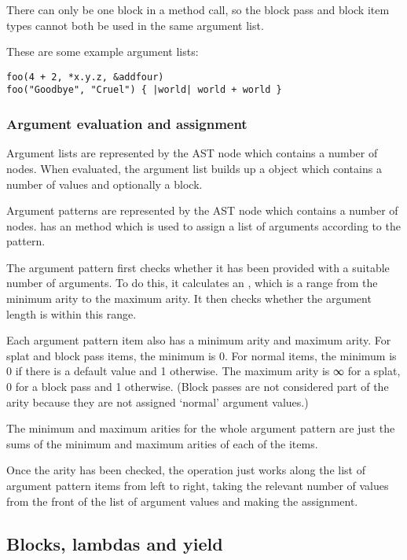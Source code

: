 There can only be one block in a method call, so the block pass and block item types cannot both be used in the same argument list.

These are some example argument lists:

\begin{lstlisting}
foo(4 + 2, *x.y.z, &addfour)
foo("Goodbye", "Cruel") { |world| world + world }
\end{lstlisting}

\subsubsection{Argument evaluation and assignment}

Argument lists are represented by the  AST node which contains a number of \-\-\code{::}\- nodes. When evaluated, the argument list builds up a  object which contains a number of values and optionally a block.

Argument patterns are represented by the  AST node which contains a number of  nodes.  has an  method which is used to assign a list of arguments according to the pattern.

The argument pattern first checks whether it has been provided with a suitable number of arguments. To do this, it calculates an , which is a range from the minimum arity to the maximum arity. It then checks whether the argument length is within this range.

Each argument pattern item also has a minimum arity and maximum arity. For splat and block pass items, the minimum is 0. For normal items, the minimum is 0 if there is a default value and 1 otherwise. The maximum arity is ∞ for a splat, 0 for a block pass and 1 otherwise. (Block passes are not considered part of the arity because they are not assigned `normal' argument values.)

The minimum and maximum arities for the whole argument pattern are just the sums of the minimum and maximum arities of each of the items.

Once the arity has been checked, the  operation just works along the list of argument pattern items from left to right, taking the relevant number of values from the front of the list of argument values and making the assignment.

\subsection{Blocks, lambdas and yield}

